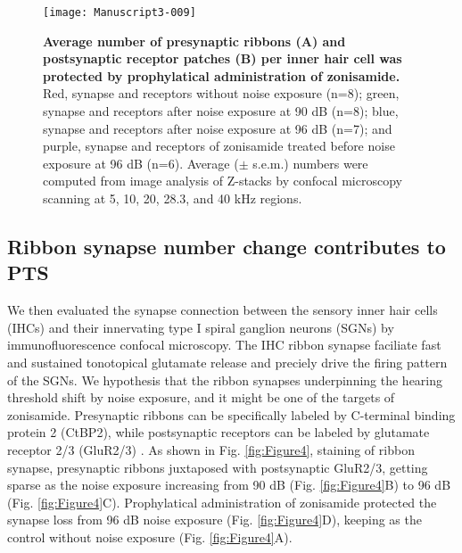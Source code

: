\documentclass[11pt]{article}
\begin{document}
\begin{figure}[ht!]
\centering
\texttt{[image: Manuscript3-009]}
\caption{{\bf {Average number of presynaptic ribbons (A) and postsynaptic receptor patches (B) per inner hair cell was protected by prophylatical administration of zonisamide.}}  Red, synapse and receptors without noise exposure (n=8); green, synapse and receptors after noise exposure at 90 dB (n=8); blue, synapse and receptors after noise exposure at 96 dB (n=7); and purple, synapse and receptors of zonisamide treated before noise exposure at 96 dB (n=6). Average ($\pm$ s.e.m.) numbers were computed from image analysis of Z-stacks by confocal microscopy scanning at 5, 10, 20, 28.3, and 40 kHz regions.}
\label{fig:Figure5}
\end{figure}


\subsection {Ribbon synapse number change contributes to PTS}
We then evaluated the synapse connection between the sensory inner hair cells (IHCs) and their innervating type I spiral ganglion neurons (SGNs) by immunofluorescence confocal microscopy. The IHC ribbon synapse faciliate fast and sustained tonotopical glutamate release and preciely drive the firing pattern of the SGNs. We hypothesis that the ribbon synapses underpinning the hearing threshold shift by noise exposure, and it might be one of the targets of zonisamide. Presynaptic ribbons can be specifically labeled by C-terminal binding protein 2 (CtBP2), while postsynaptic receptors can be labeled by glutamate receptor 2/3 (GluR2/3) \cite{Khimich2005,Liberman2011}. As shown in Fig. \ref{fig:Figure4}, staining of ribbon synapse, presynaptic ribbons juxtaposed with postsynaptic GluR2/3, getting sparse as the noise exposure increasing from 90 dB (Fig. \ref{fig:Figure4}B) to 96 dB (Fig. \ref{fig:Figure4}C). Prophylatical administration of zonisamide protected the synapse loss from 96 dB noise exposure (Fig. \ref{fig:Figure4}D), keeping as the control without noise exposure (Fig. \ref{fig:Figure4}A). 
\end{document}
